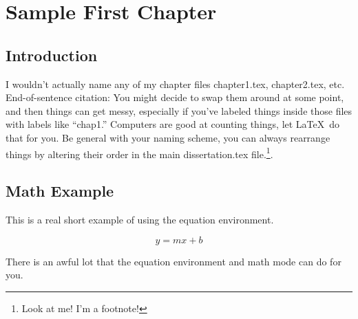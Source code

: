 \documentclass[dissertation]{uathesis}
\begin{document}



 



\chapter{Sample First Chapter\label{chap1}}


\section{Introduction}

I wouldn't actually name any of my chapter files chapter1.tex,
chapter2.tex, etc. End-of-sentence citation:\citep{story_2010}
   You might decide to swap them around at some
point, and then things can get messy, especially if you've labeled
things inside those files with labels like ``chap1.''  Computers
are good at counting things, let \LaTeX\ do that for you.  Be general
with your naming scheme, you can always rearrange things by altering
their order in the main dissertation.tex file.\footnote{Look at me!  I'm a footnote!}.


\section{Math Example\label{math}}

This is a real short example of using the equation environment.

\begin{equation}
	y = mx + b
\end{equation}

There is an awful lot that the equation environment and math mode
can do for you.
\end{document}
